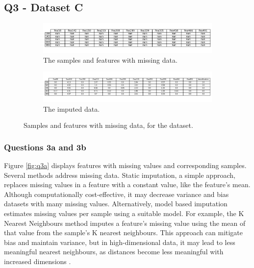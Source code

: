 
\subsection{Q3 - Dataset C}\label{subsec:dataset-c}
    \begin{figure}
    \centering
    \begin{subfigure}{0.9\textwidth}
        \centering
        \includegraphics[width=1\textwidth]{./figures/q3a}
        \caption{The samples and features with missing data.}
        \label{fig:q3a}
    \end{subfigure}%
    \hfill
    \begin{subfigure}{0.9\textwidth}
        \centering
        \includegraphics[width=1\textwidth]{./figures/q3c_1}
        \caption{The imputed data.}
        \label{fig:q3c}
    \end{subfigure}
    \caption{Samples and features with missing data, for the  dataset.}
    \label{fig:q3ac}
    \end{figure}

\subsubsection{Questions 3a and 3b}\label{subsubsec:q3ab}
    Figure \eqref{fig:q3a} displays features with missing values and corresponding samples.
    Several methods address missing data.
    Static imputation, a simple approach, replaces missing values in a feature with a constant value, like the feature's mean.
    Although computationally cost-effective, it may decrease variance and bias datasets with many missing values.
    Alternatively, model based imputation estimates missing values per sample using a suitable model.
    For example, the K Nearest Neighbours method imputes a feature's missing value using the mean of that value from
    the sample's K nearest neighbours.
    This approach can mitigate bias and maintain variance, but in high-dimensional data, it may lead to less meaningful
    nearest neighbours, as distances become less meaningful with increased dimensions \cite{bellman1957}.

